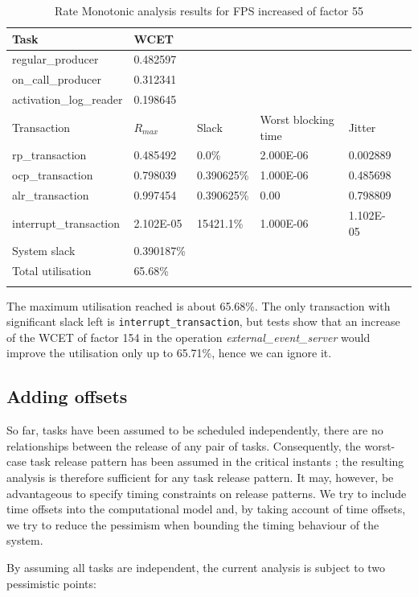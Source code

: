 \documentclass{article}
\begin{document}
\begin{longtable}{llllll}
   \toprule
   Task & WCET \\
   \midrule
   regular\_producer & 0.482597 \\
   on\_call\_producer & 0.312341 \\
   activation\_log\_reader & 0.198645 \\
   \toprule
   \toprule
   Transaction & $R_{max}$ & Slack & Worst blocking time & Jitter \\
   \midrule
   rp\_transaction & 0.485492  & 0.0\% &  2.000E-06 & 0.002889 \\
   ocp\_transaction & 0.798039 & 0.390625\% & 1.000E-06 & 0.485698 \\
   alr\_transaction & 0.997454 & 0.390625\% & 0.00 & 0.798809 \\
   interrupt\_transaction & 2.102E-05 & 15421.1\% & 1.000E-06 & 1.102E-05 \\
   \toprule
   \toprule
   System slack & 0.390187\% \\
   Total utilisation & 65.68\% \\
   \bottomrule
   \caption{Rate Monotonic analysis results for FPS increased of factor 55}
\label{tab:rm-fps-24-ocp-44-alr-56}
\end{longtable}

The maximum utilisation reached is about 65.68\%. The only transaction with significant slack left is \texttt{interrupt\_transaction}, but tests show that an increase of the WCET of factor 154 in the operation \textit{external\_event\_server} would improve the utilisation only up to 65.71\%, hence we can ignore it.

\subsection{Adding offsets}

So far, tasks have been assumed to be scheduled independently, there are no relationships between the release of any pair of tasks. Consequently, the worst-case task release pattern has been assumed in the critical instants \cite{critical-instants}; the resulting analysis is therefore sufficient for any task release pattern. It may, however, be advantageous to specify timing constraints on release patterns. We try to include time offsets into the computational model and, by taking account of time offsets, we try to reduce the pessimism when bounding the timing behaviour of the system.

By assuming all tasks are independent, the current analysis is subject to two pessimistic points:
\end{document}
